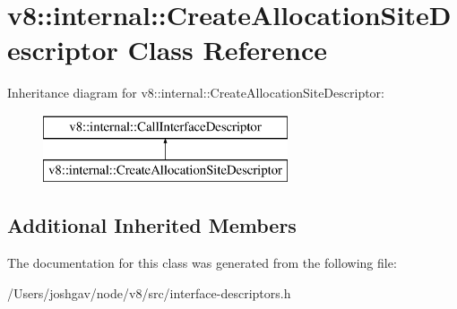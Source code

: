 \hypertarget{classv8_1_1internal_1_1_create_allocation_site_descriptor}{}\section{v8\+:\+:internal\+:\+:Create\+Allocation\+Site\+Descriptor Class Reference}
\label{classv8_1_1internal_1_1_create_allocation_site_descriptor}
Inheritance diagram for v8\+:\+:internal\+:\+:Create\+Allocation\+Site\+Descriptor\+:\begin{figure}[H]
\begin{center}
\leavevmode
\includegraphics[height=2.000000cm]{classv8_1_1internal_1_1_create_allocation_site_descriptor}
\end{center}
\end{figure}
\subsection*{Additional Inherited Members}


The documentation for this class was generated from the following file\+:\begin{DoxyCompactItemize}
\item 
/\+Users/joshgav/node/v8/src/interface-\/descriptors.\+h\end{DoxyCompactItemize}
